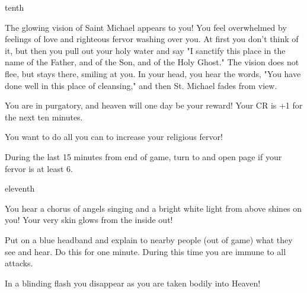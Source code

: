 \documentclass[greennotebook]{guildcamp4} %
\begin{document}
\begin{page}{tenth}

The glowing vision of Saint Michael appears to you! You feel overwhelmed by feelings of love and righteous fervor washing over you. At first you don't think of it, but then you pull out your holy water and say "I sanctify this place in the name of the Father, and of the Son, and of the Holy Ghost." The vision does not flee, but stays there, smiling at you. In your head, you hear the words, "You have done well in this place of cleansing," and then St. Michael fades from view. 

You are in purgatory, and heaven will one day be your reward! Your CR is +1 for the next ten minutes.

You want to do all you can to increase your religious fervor!

During the last 15 minutes from end of game, turn to and open page  if your fervor is at least 6.

\end{page}

\begin{page}{eleventh}

You hear a chorus of angels singing and a bright white light from above shines on you! Your very skin glows from the inside out!

Put on a blue headband and explain to nearby people (out of game) what they see and hear. Do this for one minute. During this time you are immune to all attacks.

In a blinding flash you disappear as you are taken bodily into Heaven!

\end{page}

\endnotebook
\end{document}
